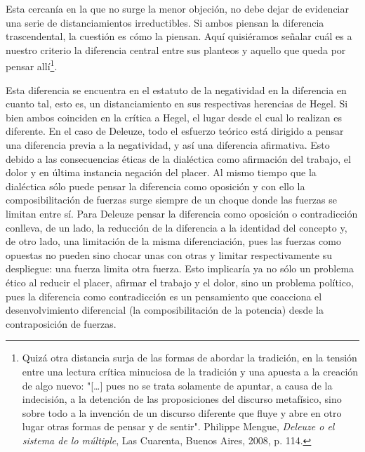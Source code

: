 \documentclass{book}
\begin{document}
Esta cercanía en la que no surge la menor objeción, no debe dejar de
evidenciar una serie de distanciamientos irreductibles. Si ambos piensan
la diferencia trascendental, la cuestión es cómo la piensan. Aquí
quisiéramos señalar cuál es a nuestro criterio la diferencia central
entre sus planteos y aquello que queda por pensar allí\footnote{Quizá
  otra distancia surja de las formas de abordar la tradición, en la
  tensión entre una lectura crítica minuciosa de la tradición y una
  apuesta a la creación de algo nuevo: "{[}\ldots{]} pues no se trata
  solamente de apuntar, a causa de la indecisión, a la detención de las
  proposiciones del discurso metafísico, sino sobre todo a la invención
  de un discurso diferente que fluye y abre en otro lugar otras formas
  de pensar y de sentir". Philippe Mengue, \emph{Deleuze o el sistema de
  lo múltiple}, Las Cuarenta, Buenos Aires, 2008, p. 114.}.

Esta diferencia se encuentra en el estatuto de la negatividad en la
diferencia en cuanto tal, esto es, un distanciamiento en sus respectivas
herencias de Hegel. Si bien ambos coinciden en la crítica a Hegel, el
lugar desde el cual lo realizan es diferente. En el caso de Deleuze,
todo el esfuerzo teórico está dirigido a pensar una diferencia previa a
la negatividad, y así una diferencia afirmativa. Esto debido a las
consecuencias éticas de la dialéctica como afirmación del trabajo, el
dolor y en última instancia negación del placer. Al mismo tiempo que la
dialéctica sólo puede pensar la diferencia como oposición y con ello la
composibilitación de fuerzas surge siempre de un choque donde las
fuerzas se limitan entre sí. Para Deleuze pensar la diferencia como
oposición o contradicción conlleva, de un lado, la reducción de la
diferencia a la identidad del concepto y, de otro lado, una limitación
de la misma diferenciación, pues las fuerzas como opuestas no pueden
sino chocar unas con otras y limitar respectivamente su despliegue: una
fuerza limita otra fuerza. Esto implicaría ya no sólo un problema ético
al reducir el placer, afirmar el trabajo y el dolor, sino un problema
político, pues la diferencia como contradicción es un pensamiento que
coacciona el desenvolvimiento diferencial (la composibilitación de la
potencia) desde la contraposición de fuerzas.
\end{document}
